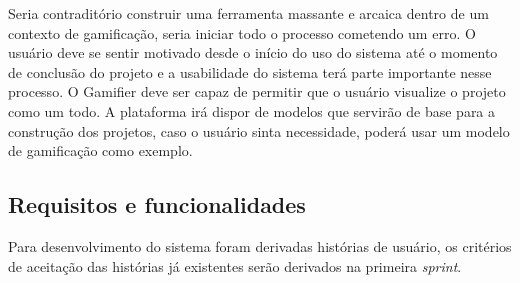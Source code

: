 Seria contraditório construir uma ferramenta massante e arcaica dentro de um contexto de gamificação, seria iniciar todo o processo cometendo um erro. O usuário deve se sentir motivado desde o início do uso do sistema até o momento de conclusão do projeto e a usabilidade do sistema terá parte importante nesse processo. O Gamifier deve ser capaz de permitir que o usuário visualize o projeto como um todo.  A plataforma irá dispor de modelos que servirão de base para a construção dos projetos, caso o usuário sinta necessidade, poderá usar um modelo de gamificação como exemplo. 
\newpage


\subsection{Requisitos e funcionalidades}
Para desenvolvimento do sistema foram derivadas histórias de usuário, os critérios de aceitação das histórias já existentes serão derivados na primeira \textit{sprint}.



